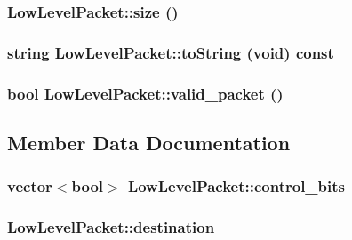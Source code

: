 \hypertarget{classLowLevelPacket_f61b1051a4dbda237dbeb1bd74220d20}{
\subsubsection[{size}]{ LowLevelPacket::size ()}}
\label{classLowLevelPacket_f61b1051a4dbda237dbeb1bd74220d20}


\hypertarget{classLowLevelPacket_5a52563bae0560cb9b0b9a6d44adde6c}{
\subsubsection[{toString}]{\setlength{\rightskip}{0pt plus 5cm}string LowLevelPacket::toString (void) const}}
\label{classLowLevelPacket_5a52563bae0560cb9b0b9a6d44adde6c}


\hypertarget{classLowLevelPacket_1053348a061e1878e90a4f49d383889f}{
\subsubsection[{valid\_\-packet}]{\setlength{\rightskip}{0pt plus 5cm}bool LowLevelPacket::valid\_\-packet ()}}
\label{classLowLevelPacket_1053348a061e1878e90a4f49d383889f}




\subsection{Member Data Documentation}
\hypertarget{classLowLevelPacket_7537b9b0339e77d3d4a2d04998e1a950}{
\subsubsection[{control\_\-bits}]{\setlength{\rightskip}{0pt plus 5cm}vector$<$bool$>$ {\bf LowLevelPacket::control\_\-bits}}}
\label{classLowLevelPacket_7537b9b0339e77d3d4a2d04998e1a950}


\hypertarget{classLowLevelPacket_225808b46aefe4d252c040e91c9411b0}{
\subsubsection[{destination}]{ {\bf LowLevelPacket::destination}}}
\label{classLowLevelPacket_225808b46aefe4d252c040e91c9411b0}


